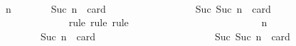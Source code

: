 \begin{isabellebody}
\ \ \ \ \ \ \ \ \isamarkupfalse%
\ \isanewline
\ \ \ \ \ \ \ \ \ \ \isamarkupfalse%
\ {\isachardoublequoteopen}{\isasymAnd}n{\isachardot}\ {\isasymforall}{\isasymsigma}{\isasymin}{\isasymSigma}{\isachardot}\ {\isasymforall}{\isasymsigma}{\isacharprime}{\isasymin}{\isasymSigma}{\isachardot}\ {\isasymnot}\ {\isasymsigma}\ {\isasymsubseteq}\ {\isasymsigma}{\isacharprime}\ {\isasymand}\ Suc\ n\ {\isacharequal}\ card\ {\isacharparenleft}{\isasymsigma}\ {\isacharminus}\ {\isasymsigma}{\isacharprime}{\isacharparenright}\ {\isasymlongrightarrow}\ {\isasymsigma}\ {\isasymunion}\ {\isasymsigma}{\isacharprime}\ {\isasymin}\ {\isasymSigma}\ {\isasymLongrightarrow}\ {\isasymforall}{\isasymsigma}{\isasymin}{\isasymSigma}{\isachardot}\ {\isasymforall}{\isasymsigma}{\isacharprime}{\isasymin}{\isasymSigma}{\isachardot}\ {\isasymnot}\ {\isasymsigma}\ {\isasymsubseteq}\ {\isasymsigma}{\isacharprime}\ {\isasymand}\ Suc\ {\isacharparenleft}Suc\ n{\isacharparenright}\ {\isacharequal}\ card\ {\isacharparenleft}{\isasymsigma}\ {\isacharminus}\ {\isasymsigma}{\isacharprime}{\isacharparenright}\ {\isasymlongrightarrow}\ {\isasymsigma}\ {\isasymunion}\ {\isasymsigma}{\isacharprime}\ {\isasymin}\ {\isasymSigma}{\isachardoublequoteclose}\isanewline
\ \ \ \ \ \ \ \ \ \ \ \ \isamarkupfalse%
\ {\isacharparenleft}rule{\isacharcomma}\ rule{\isacharcomma}\ rule{\isacharparenright}\isanewline
\ \ \ \ \ \ \ \ \ \ \isamarkupfalse%
\ {\isacharminus}\isanewline
\ \ \ \ \ \ \ \ \ \ \ \ \isamarkupfalse%
\ n\ {\isasymsigma}\ {\isasymsigma}{\isacharprime}\isanewline
\ \ \ \ \ \ \ \ \ \ \ \ \isamarkupfalse%
\ {\isachardoublequoteopen}{\isasymforall}{\isasymsigma}{\isasymin}{\isasymSigma}{\isachardot}\ {\isasymforall}{\isasymsigma}{\isacharprime}{\isasymin}{\isasymSigma}{\isachardot}\ {\isasymnot}\ {\isasymsigma}\ {\isasymsubseteq}\ {\isasymsigma}{\isacharprime}\ {\isasymand}\ Suc\ n\ {\isacharequal}\ card\ {\isacharparenleft}{\isasymsigma}\ {\isacharminus}\ {\isasymsigma}{\isacharprime}{\isacharparenright}\ {\isasymlongrightarrow}\ {\isasymsigma}\ {\isasymunion}\ {\isasymsigma}{\isacharprime}\ {\isasymin}\ {\isasymSigma}{\isachardoublequoteclose}\ \ {\isachardoublequoteopen}{\isasymsigma}\ {\isasymin}\ {\isasymSigma}{\isachardoublequoteclose}\ \ {\isachardoublequoteopen}{\isasymsigma}{\isacharprime}\ {\isasymin}\ {\isasymSigma}{\isachardoublequoteclose}\ \ {\isachardoublequoteopen}{\isasymnot}\ {\isasymsigma}\ {\isasymsubseteq}\ {\isasymsigma}{\isacharprime}\ {\isasymand}\ Suc\ {\isacharparenleft}Suc\ n{\isacharparenright}\ {\isacharequal}\ card\ {\isacharparenleft}{\isasymsigma}\ {\isacharminus}\ {\isasymsigma}{\isacharprime}{\isacharparenright}{\isachardoublequoteclose}\ \isanewline

\end{isabellebody}
